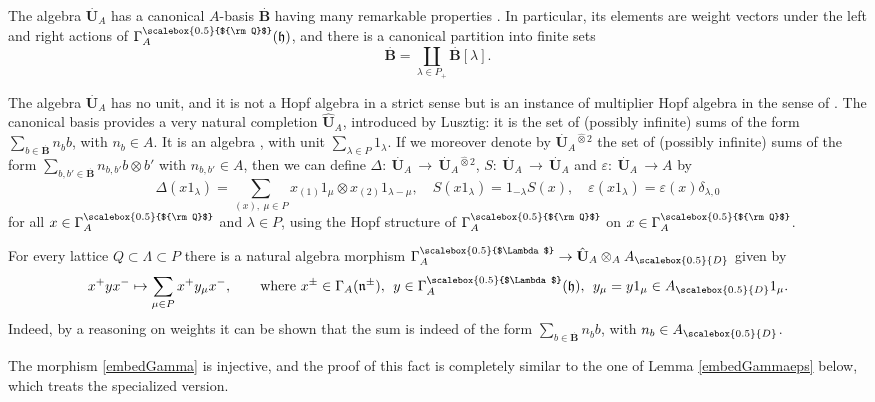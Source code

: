 \documentclass[11pt]{amsart}
\newcommand{\AD}{A_{\scalebox{0.5}{D}}}
\newcommand{\Q}{{\scalebox{0.5}{${\rm Q}$}}}
\newcommand{\Lam}{{\scalebox{0.5}{$\Lambda$}}}
\begin{document}
The algebra $\stackrel{.}{\mathbf{U}}_A$ has a canonical $A$-basis $\stackrel{.}{\mathbf{B}}$ having many remarkable properties \cite[Chap.\,25 and 29]{Lusztig}. In particular, its elements are weight vectors under the left and right actions of $\Gamma_A^\Q(\mathfrak{h})$, and there is a canonical partition into finite sets $$\textstyle \stackrel{.}{\mathbf{B}} = \coprod_{\lambda\in P_+} \stackrel{.}{\mathbf{B}}\!\![\lambda].$$

The algebra $\stackrel{.}{\mathbf{U}}_A$ has no unit, and it is not a Hopf algebra in a strict sense but is an instance of multiplier Hopf algebra in the sense of \cite{VD1}. The canonical basis provides a very natural completion $\hat{{\mathbf{U}}}_A$, introduced by Lusztig: it is the set of (possibly infinite) sums of the form $\textstyle \sum_{b\in\stackrel{.}{\mathbf{B}} }n_b b$, with $n_b\in A$. It is an algebra \cite{Lusztig3}, with unit $\textstyle \sum_{\lambda\in P} 1_\lambda$. If we moreover denote by $\stackrel{.}{\mathbf{U}}_A\!\!{}^{\hat{\otimes} 2}$ the set of (possibly infinite) sums of the form $\textstyle \sum_{b,b'\in\stackrel{.}{\mathbf{B}} }n_{b,b'} b\otimes b'$ with $n_{b,b'}\in A$, then we can define $\Delta :\: \stackrel{.}{\mathbf{U}}_A \,\to\, \stackrel{.}{\mathbf{U}}_A\!\!{}^{\hat{\otimes} 2}$, $S : \:\stackrel{.}{\mathbf{U}}_A \,\to\, \stackrel{.}{\mathbf{U}}_A$ and $\varepsilon :\: \stackrel{.}{\mathbf{U}}_A \,\to A$ by
\[ \Delta(x1_{\lambda}) = \sum_{(x),\:\mu \in P} x_{(1)}1_{\mu} \otimes x_{(2)}1_{\lambda - \mu}, \quad S(x1_{\lambda}) = 1_{-\lambda}S(x), \quad \varepsilon(x1_{\lambda}) = \varepsilon(x)\delta_{\lambda,0} \]
for all $x \in \Gamma_A^\Q$ and $\lambda \in P$, using the Hopf structure of $\Gamma_A^\Q$ on $x \in \Gamma_A^\Q$.
\smallskip

For every lattice $Q\subset \Lambda\subset P$ there is a natural algebra morphism $\Gamma_A^\Lam \to \hat{{\mathbf{U}}}_A \otimes_A \AD$ given by
\begin{equation}\label{embedGamma}
x^+ y x^{-} \mapsto \sum_{\mu\in P}x^+ y _\mu x^{-}, \qquad \text{where } x^{\pm}\in \Gamma_A(\mathfrak{n}^{\pm}), \:\: y\in \Gamma_A^\Lam(\mathfrak{h}), \:\: y_\mu= y 1_{\mu}\in \AD 1_\mu.
\end{equation}
Indeed, by a reasoning on weights it can  be shown that the sum is indeed of the form $\textstyle \sum_{b\in\stackrel{.}{\mathbf{B}} }n_b b$, with $n_b\in \AD$.

The morphism \eqref{embedGamma} is injective, and the proof of this fact is completely similar to the one of Lemma \ref{embedGammaeps} below, which treats the specialized version. 
\end{document}
